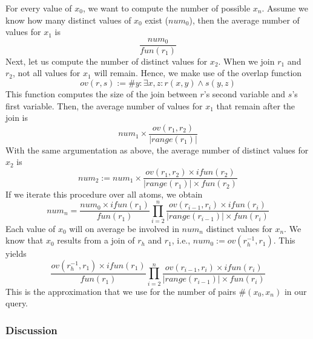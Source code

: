 {%
For every value of $x_0$, we want to compute the number of possible $x_n$. Assume we know how many distinct values of $x_0$ exist ($num_0$), then the average number of values for $x_1$ is
$$\frac{num_0}{fun(r_1)}$$
Next, let us compute the number of distinct values for $x_2$. When we join $r_1$ and $r_2$, not all values for $x_1$ will remain. Hence, we make use of the overlap function
$$ov(r,s) := \# y: \exists x,z: r(x,y) \wedge s(y,z)$$
This function computes the size of the join between $r$'s second variable and $s$'s first variable.
Then, the average number of values for $x_1$ that remain after the join is
$$num_1 \times \frac{ov(r_1,r_2)}{|range(r_1)|}$$
 With the same argumentation as above, the average number of distinct values for $x_2$ is
$$num_2 := num_1 \times \frac{ov(r_1,r_2) \times ifun(r_2)}{|range(r_1)| \times fun(r_2)}$$
 If we iterate this procedure over all atoms, we obtain
$$num_n = \frac{num_0 \times ifun(r_1)}{fun(r_1)} \prod_{i=2}^n \frac{ov(r_{i-1},r_i) \times ifun(r_i)}{|range(r_{i-1})| \times fun(r_i)}$$
Each value of $x_0$ will on average be involved in $num_n$ distinct values for $x_n$.
We know that $x_0$ results from a join of $r_h$ and $r_1$, i.e., $num_0 := ov(r_h^{-1},r_1)$. This yields
$$\frac{ov(r_h^{-1},r_1) \times ifun(r_1)}{fun(r_1)} \prod_{i=2}^n \frac{ov(r_{i-1},r_i) \times ifun(r_i)}{|range(r_{i-1})| \times fun(r_i)}$$
This is the approximation that we use for the number of pairs $\#(x_0,x_n)$ in our query.




\subsubsection{Discussion}

}
